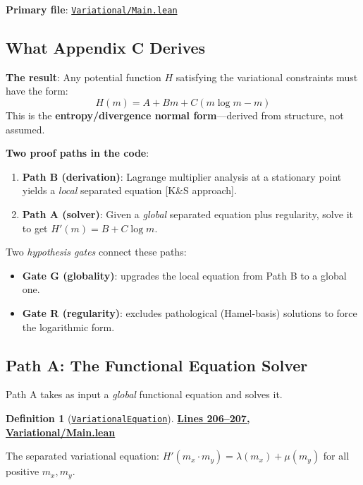 \documentclass[11pt]{article}
\theoremstyle{definition}
\newtheorem{definition}[theorem]{Definition}
\theoremstyle{remark}
\begin{document}
\textbf{Primary file}: \href{https://github.com/zariuq/ks-foundations-of-inference/blob/main/KnuthSkilling/Variational/Main.lean}{\texttt{Variational/Main.lean}}

\subsection{What Appendix C Derives}

\textbf{The result}: Any potential function $H$ satisfying the variational constraints must have the form:
\[ H(m) = A + Bm + C(m \log m - m) \]
This is the \textbf{entropy/divergence normal form}---derived from structure, not assumed.

\textbf{Two proof paths in the code}:
\begin{enumerate}
\item \textbf{Path B (derivation)}: Lagrange multiplier analysis at a stationary point yields a \emph{local} separated equation [K\&S approach].
\item \textbf{Path A (solver)}: Given a \emph{global} separated equation plus regularity, solve it to get $H'(m) = B + C \log m$.
\end{enumerate}

Two \emph{hypothesis gates} connect these paths:
\begin{itemize}
\item \textbf{Gate G (globality)}: upgrades the local equation from Path B to a global one.
\item \textbf{Gate R (regularity)}: excludes pathological (Hamel-basis) solutions to force the logarithmic form.
\end{itemize}

\subsection{Path A: The Functional Equation Solver}
\label{subsec:var-pathA}

Path A takes as input a \emph{global} functional equation and solves it.

\begin{definition}[\href{https://github.com/zariuq/ks-foundations-of-inference/blob/main/KnuthSkilling/Variational/Main.lean\#L206}{\texttt{VariationalEquation}}]
\textbf{\href{https://github.com/zariuq/ks-foundations-of-inference/blob/main/KnuthSkilling/Variational/Main.lean\#L206-L207}{Lines 206--207, Variational/Main.lean}}

The separated variational equation: $H'(m_x \cdot m_y) = \lambda(m_x) + \mu(m_y)$ for all positive $m_x, m_y$.
\end{definition}
\end{document}
